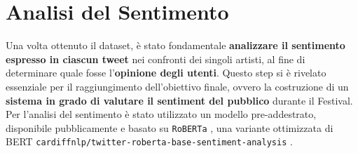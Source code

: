 \documentclass[a4paper,12pt]{article}
\begin{document}
\section{Analisi del Sentimento}
Una volta ottenuto il dataset, è stato fondamentale \textbf{analizzare il sentimento espresso in ciascun tweet} nei confronti dei singoli artisti, al fine di determinare quale fosse l'\textbf{opinione degli utenti}. Questo step si è rivelato essenziale per il raggiungimento dell’obiettivo finale, ovvero la costruzione di un \textbf{sistema in grado di valutare il sentiment del pubblico} durante il Festival.\\Per l’analisi del sentimento è stato utilizzato un modello pre-addestrato, disponibile pubblicamente e basato su \texttt{RoBERTa} \cite{roberta}, una variante ottimizzata di BERT \cite{bert} \texttt{cardiffnlp/twitter-roberta-base-sentiment-analysis} \cite{roberta-base-sentiment-analysis}.
\end{document}
